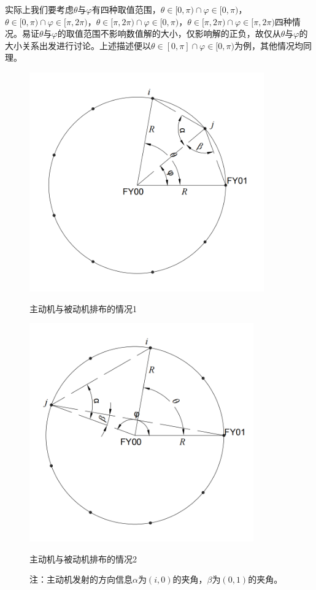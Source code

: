 \documentclass[withoutpreface,bwprint]{cumcmthesis} %
\begin{document}
实际上我们要考虑$\theta$与$\varphi$有四种取值范围，$\theta \in[0,\pi)\cap \varphi \in[0,\pi)$，$\theta \in[0,\pi)\cap \varphi \in[\pi,2\pi)$，$\theta \in[\pi,2\pi)\cap \varphi \in[0,\pi)$，$\theta \in[\pi,2\pi)\cap \varphi \in[\pi,2\pi)$四种情况。易证$\theta$与$\varphi$的取值范围不影响数值解的大小，仅影响解的正负，故仅从$\theta$与$\varphi$的大小关系出发进行讨论。上述描述便以$\theta \in[0,\pi]\cap \varphi \in[0,\pi)$为例，其他情况均同理。


\begin{figure}[H]
    \centering
    \begin{minipage}{0.49\textwidth}
        \centering
        \includegraphics[width=0.9\textwidth]{../../figure/q1_1.png} 
        \caption{主动机与被动机排布的情况1}
        \label{q1_1}
    \end{minipage}
    \begin{minipage}{0.49\textwidth}
        \centering
        \includegraphics[width=0.86\textwidth]{../../figure/q1_2.png} 
        \caption{主动机与被动机排布的情况2}
        \label{q1_2}   
    \end{minipage}
    \caption*{\small 注：主动机发射的方向信息$\alpha$为$(i,0)$的夹角，$\beta$为$(0,1)$的夹角。}
\end{figure}
\end{document}
